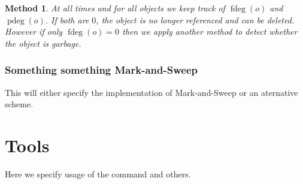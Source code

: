 \documentclass{article}
\newtheorem{method}{Method}
\newcommand{\mas}{Mark-and-Sweep }
\DeclareMathOperator{\problemdeg}{pdeg}
\DeclareMathOperator{\finedeg}{fdeg}
\newcommand{\code}[1]{\tcbox[on line, left=0mm,top=0.7mm,right=0mm,bottom=0.7mm]{\texttt{#1}}}
\begin{document}
	\medskip

	\begin{method}
		At all times and for all objects we keep track of $\finedeg(o)$ and $\problemdeg(o)$. If both are $0$, the object is no longer referenced and can be deleted. However if only $\finedeg(o)=0$ then we apply another method to detect whether the object is garbage.
	\end{method}

	\subsubsection{Something something \mas}

	This will either specify the implementation of \mas or an aternative scheme.

	\section{Tools}

	Here we specify usage of the \code{ernie} command and others.
\end{document}
